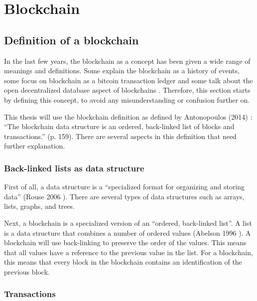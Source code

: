 \section{Blockchain}

\subsection{Definition of a blockchain}

\iffalse
todo: 
- different interpretations of blockchain
- reread and remove weird references
\fi

In the last few years, the blockchain as a concept has been given a wide range of meanings and definitions. Some explain the blockchain as a history of events, some focus on blockchain as a bitcoin transaction ledger and some talk about the open decentralized database aspect of blockchains \cite{blockchain-multiple-definitions}. Therefore, this section starts by defining this concept, to avoid any misunderstanding or confusion further on.

This thesis will use the blockchain definition as defined by Antonopoulos (2014) \cite{antonopoulos:2014}: ``The blockchain data structure is an ordered, back-linked list of blocks and transactions.'' (p. 159). There are several aspects in this definition that need further explanation.

\subsubsection{Back-linked lists as data structure}

First of all, a data structure is a ``specialized format for organizing and storing data'' (Rouse 2006 \cite{data-structure}). There are several types of data structures such as arrays, lists, graphs, and trees.

Next, a blockchain is a specialized version of an ``ordered, back-linked list''. A list is a data structure that combines a number of ordered values (Abelson 1996 \cite{abelson:1996}). A blockchain will use back-linking to preserve the order of the values. This means that all values have a reference to the previous value in the list. For a blockchain, this means that every block in the blockchain contains an identification of the previous block.

\subsubsection{Transactions}

